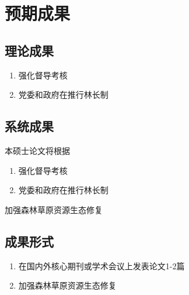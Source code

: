 \section{预期成果}

\subsection{理论成果}

\begin{enumerate}
    \item 强化督导考核
    \item 党委和政府在推行林长制
\end{enumerate}

\subsection{系统成果}

本硕士论文将根据

\begin{enumerate}
    \item 强化督导考核
    \item 党委和政府在推行林长制
\end{enumerate}

加强森林草原资源生态修复

\subsection{成果形式}

\begin{enumerate}
    \item 在国内外核心期刊或学术会议上发表论文1-2篇
    \item 加强森林草原资源生态修复
\end{enumerate}